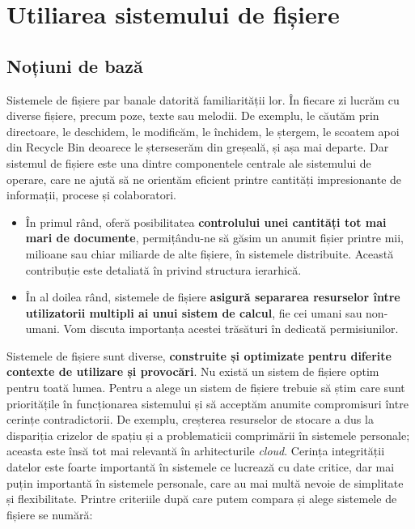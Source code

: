 \chapter{Utiliarea sistemului de fișiere}
\label{chapter:file-system}

\section{Noțiuni de bază}
\label{sec:file-system-baza}

Sistemele de fișiere par banale datorită familiarității lor. În fiecare zi
lucrăm cu diverse fișiere, precum poze, texte sau melodii. De exemplu, le
căutăm prin directoare, le deschidem, le modificăm, le închidem, le ștergem, le
scoatem apoi din Recycle Bin deoarece le șterseserăm din greșeală, și așa mai
departe. Dar sistemul de fișiere este una dintre componentele centrale ale
sistemului de operare, care ne ajută să ne orientăm eficient printre cantități
impresionante de informații, procese și colaboratori.

\begin{itemize}
	\item În primul rând, oferă posibilitatea \textbf{controlului unei
		cantități tot mai mari de documente}, permițându-ne să găsim un
		anumit fișier printre mii, milioane sau chiar miliarde de alte
		fișiere, în sistemele distribuite. Această contribuție este
		detaliată în 
		privind structura ierarhică.
	\item În al doilea rând, sistemele de fișiere \textbf{asigură separarea
		resurselor între utilizatorii multipli ai unui sistem de
		calcul}, fie cei umani sau non-umani. Vom discuta importanța
		acestei trăsături în 
		dedicată permisiunilor.
\end{itemize}

Sistemele de fișiere sunt diverse, \textbf{construite și optimizate pentru
diferite contexte de utilizare și provocări}. Nu există un sistem de fișiere
optim pentru toată lumea. Pentru a alege un sistem de fișiere trebuie să știm
care sunt prioritățile în funcționarea sistemului și să acceptăm anumite
compromisuri între cerințe contradictorii. De exemplu, creșterea resurselor de
stocare a dus la dispariția crizelor de spațiu și a problematicii comprimării în
sistemele personale; aceasta este însă tot mai relevantă în arhitecturile
\textit{cloud}. Cerința integrității datelor este foarte importantă în sistemele
ce lucrează cu date critice, dar mai puțin importantă în sistemele personale,
care au mai multă nevoie de simplitate și flexibilitate. Printre criteriile după
care putem compara și alege sistemele de fișiere se numără:

